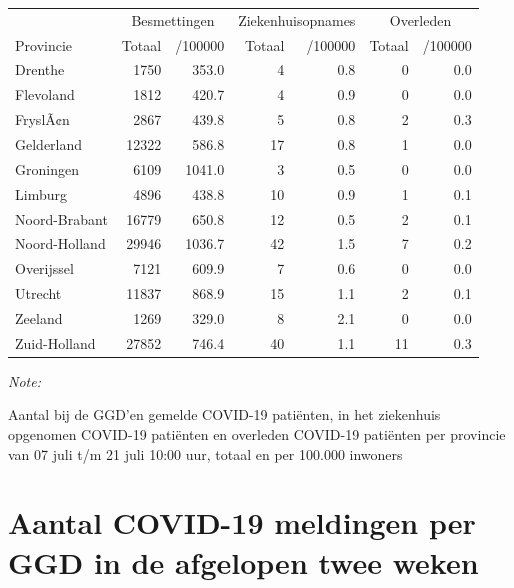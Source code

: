 \documentclass[
  english,
  man,floatsintext]{apa6}
\begin{document}
\begin{table}
\centering
\begin{threeparttable}
\begin{tabular}{lrrrrrr}
\toprule
\multicolumn{1}{c}{ } & \multicolumn{2}{c}{Besmettingen} & \multicolumn{2}{c}{Ziekenhuisopnames} & \multicolumn{2}{c}{Overleden} \\
\cmidrule(l{3pt}r{3pt}){2-3} \cmidrule(l{3pt}r{3pt}){4-5} \cmidrule(l{3pt}r{3pt}){6-7}
Provincie & Totaal & /100000 & Totaal & /100000 & Totaal & /100000\\
\midrule
Drenthe & 1750 & 353.0 & 4 & 0.8 & 0 & 0.0\\
Flevoland & 1812 & 420.7 & 4 & 0.9 & 0 & 0.0\\
FryslÃ¢n & 2867 & 439.8 & 5 & 0.8 & 2 & 0.3\\
Gelderland & 12322 & 586.8 & 17 & 0.8 & 1 & 0.0\\
Groningen & 6109 & 1041.0 & 3 & 0.5 & 0 & 0.0\\
Limburg & 4896 & 438.8 & 10 & 0.9 & 1 & 0.1\\
Noord-Brabant & 16779 & 650.8 & 12 & 0.5 & 2 & 0.1\\
Noord-Holland & 29946 & 1036.7 & 42 & 1.5 & 7 & 0.2\\
Overijssel & 7121 & 609.9 & 7 & 0.6 & 0 & 0.0\\
Utrecht & 11837 & 868.9 & 15 & 1.1 & 2 & 0.1\\
Zeeland & 1269 & 329.0 & 8 & 2.1 & 0 & 0.0\\
Zuid-Holland & 27852 & 746.4 & 40 & 1.1 & 11 & 0.3\\
\bottomrule
\end{tabular}
\begin{tablenotes}
\item \textit{Note: } 
\item Aantal bij de GGD’en gemelde COVID-19 patiënten, in het ziekenhuis opgenomen COVID-19 patiënten en overleden COVID-19 patiënten per provincie van 07 juli t/m 21 juli 10:00 uur, totaal en per 100.000 inwoners
\end{tablenotes}
\end{threeparttable}
\end{table}

\newpage

\hypertarget{aantal-covid-19-meldingen-per-ggd-in-de-afgelopen-twee-weken}{%
\section{Aantal COVID-19 meldingen per GGD in de afgelopen twee weken}\label{aantal-covid-19-meldingen-per-ggd-in-de-afgelopen-twee-weken}}
\end{document}
